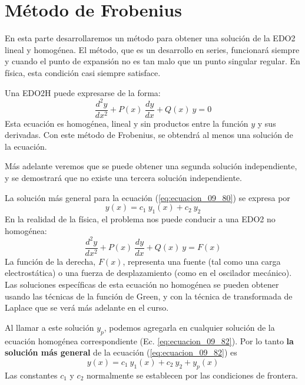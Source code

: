 \section{Método de Frobenius}
En esta parte desarrollaremos un método para obtener una solución de la EDO2 lineal y homogénea. El método, que es un desarrollo en series, funcionará siempre y cuando el punto de expansión no es tan malo que un punto singular regular. En física, esta condición casi siempre satisface.
\par
Una EDO2H puede expresarse de la forma:
\begin{equation}
\boxed{\dfrac{d^{2} y}{d x^{2}} + P(x) \: \dfrac{dy}{dx} + Q(x) \: y = 0}
\label{eq:ecuacion_09_80}
\end{equation}
Esta ecuación es homogénea, lineal y sin productos entre la función $y$ y sus derivadas. Con este método de Frobenius, se obtendrá al menos una solución de la ecuación.
\par
Más adelante veremos que se puede obtener una segunda solución independiente, y se demostrará que no existe una tercera solución independiente.
\par
La solución más general para la ecuación (\ref{eq:ecuacion_09_80}) se expresa por
\begin{equation}
\boxed{y(x) = c_{1} \: y_{1}(x) + c_{2} \: y_{2}}
\label{eq:ecuacion_09_81}
\end{equation}
En la realidad de la física, el problema nos puede conducir a una EDO2 no homogénea:
\begin{equation}
\boxed{\dfrac{d^{2} y}{d x^{2}} + P(x) \: \dfrac{dy}{dx} + Q(x) \: y = F(x)}
\label{eq:ecuacion_09_82}
\end{equation}
La función de la derecha, $F(x)$, representa una fuente (tal como una carga electrostática) o una fuerza de desplazamiento (como en el oscilador mecánico). Las soluciones específicas de esta ecuación no homogénea se pueden obtener usando las técnicas de la función de Green, y con la técnica de transformada de Laplace que se verá más adelante en el curso.
\par
Al llamar a este solución $y_{p}$, podemos agregarla en cualquier solución de la ecuación homogénea correspondiente (Ec. \ref{eq:ecuacion_09_82}). Por lo tanto \textbf{la solución más general} de la ecuación (\ref{eq:ecuacion_09_82}) es
\begin{equation}
\boxed{y(x) = c_{1} \: y_{1}(x) + c_{2} \: y_{2} + y_{p} (x) }
\label{eq:ecuacion_09_83}
\end{equation}
Las constantes $c_{1}$ y $c_{2}$ normalmente se establecen por las condiciones de frontera.
